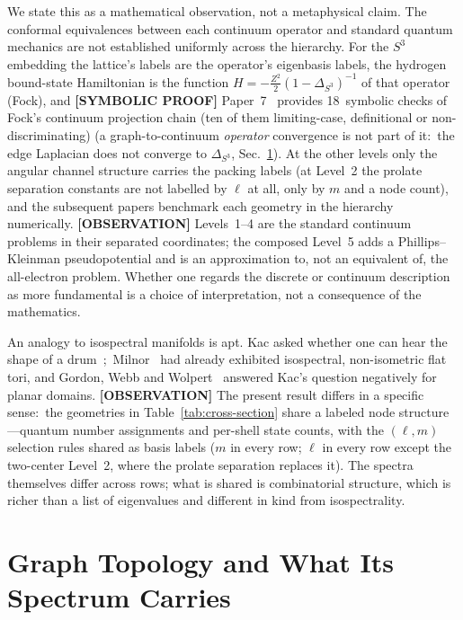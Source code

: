 \documentclass[aps,prl,reprint,amsmath,amssymb]{revtex4-2}
\begin{document}
We state this as a mathematical observation, not a metaphysical claim.
The conformal equivalences between each continuum operator and
standard quantum mechanics are not established uniformly across the
hierarchy.  For the $S^3$ embedding the lattice's labels are the
operator's eigenbasis labels, the hydrogen bound-state Hamiltonian is
the function $H = -\tfrac{Z^2}{2}(1-\Delta_{S^3})^{-1}$ of that operator (Fock), and
\textbf{[SYMBOLIC PROOF]} Paper~7~\cite{paper7} provides 18~symbolic checks of Fock's
continuum projection chain (ten of them limiting-case, definitional or
non-discriminating) (a graph-to-continuum
\emph{operator} convergence is not part of it:\ the edge Laplacian does
not converge to $\Delta_{S^3}$, Sec.~\ref{sec:graph}).  At the other
levels only the angular channel structure carries the packing labels
(at Level~2 the prolate separation constants are not labelled by
$\ell$ at all, only by $m$ and a node count), and the subsequent
papers benchmark each geometry in the hierarchy numerically.
\textbf{[OBSERVATION]} Levels~1--4 are the standard continuum problems
in their separated coordinates; the composed Level~5 adds
a Phillips--Kleinman pseudopotential and is an approximation to, not
an equivalent of, the all-electron problem.
Whether one regards the discrete or continuum description as more
fundamental is a choice of interpretation, not a consequence of the
mathematics.

An analogy to isospectral manifolds is apt.  Kac asked whether one
can hear the shape of a drum~\cite{kac1966};\ Milnor~\cite{milnor1964}
had already exhibited isospectral, non-isometric flat tori, and Gordon,
Webb and Wolpert~\cite{gww1992} answered Kac's question negatively for
planar domains.  \textbf{[OBSERVATION]} The present result differs in a
specific sense:\ the geometries in Table~\ref{tab:cross-section} share
a labeled node structure---quantum number assignments and per-shell
state counts, with the $(\ell, m)$ selection rules shared as basis
labels ($m$ in every row; $\ell$ in every row except the two-center
Level~2, where the prolate separation replaces it).  The spectra themselves differ across rows; what is shared is
combinatorial structure, which is richer than a list of eigenvalues
and different in kind from isospectrality.


\section{Graph Topology and What Its Spectrum Carries}
\label{sec:graph}
\end{document}
